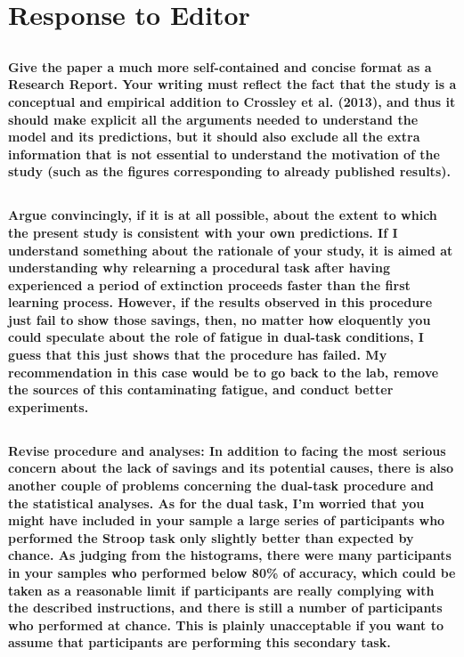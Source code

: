 \documentclass[10pt,a4paper]{article} \usepackage{amsmath} \usepackage{parskip}
\begin{document}
\section{Response to Editor}
\subsection{} \textbf{Give the paper a much more self-contained and concise
format as a Research Report. Your writing must reflect the fact that the study
is a conceptual and empirical addition to Crossley et al. (2013), and thus it
should make explicit all the arguments needed to understand the model and its
predictions, but it should also exclude all the extra information that is not
essential to understand the motivation of the study (such as the figures
corresponding to already published results).}

\subsection{} \textbf{Argue convincingly, if it is at all possible, about the
extent to which the present study is consistent with your own predictions. If I
understand something about the rationale of your study, it is aimed at
understanding why relearning a procedural task after having experienced a period
of extinction proceeds faster than the first learning process. However, if the
results observed in this procedure just fail to show those savings, then, no
matter how eloquently you could speculate about the role of fatigue in dual-task
conditions, I guess that this just shows that the procedure has failed. My
recommendation in this case would be to go back to the lab, remove the sources
of this contaminating fatigue, and conduct better experiments.}

\subsection{} \textbf{Revise procedure and analyses: In addition to facing the
most serious concern about the lack of savings and its potential causes, there
is also another couple of problems concerning the dual-task procedure and the
statistical analyses. As for the dual task, I'm worried that you might have
included in your sample a large series of participants who performed the Stroop
task only slightly better than expected by chance. As judging from the
histograms, there were many participants in your samples who performed below
80\% of accuracy, which could be taken as a reasonable limit if participants are
really complying with the described instructions, and there is still a number of
participants who performed at chance. This is plainly unacceptable if you want
to assume that participants are performing this secondary task.}
\end{document}
